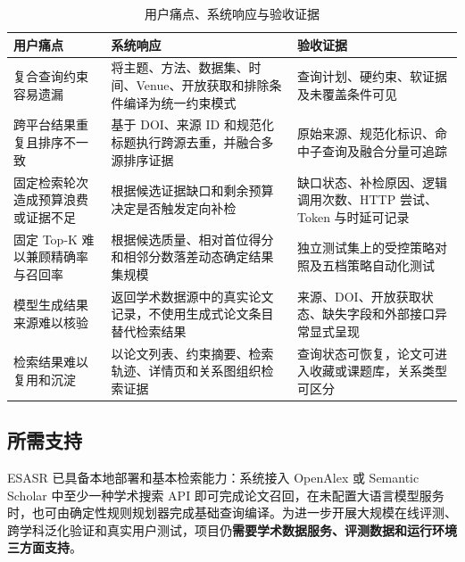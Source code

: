 \documentclass[a4paper,12pt,fontset=none]{ctexart}
\begin{document}
\begin{table}[H]
	\centering
	\caption{用户痛点、系统响应与验收证据}
	\small
	
	\begin{tabularx}{\textwidth}{C{2.8cm} Y Y}
		\toprule
		
		\textbf{用户痛点}
		& \textbf{系统响应}
		& \textbf{验收证据} \\
		
		\midrule
		
		复合查询约束容易遗漏
		& 将主题、方法、数据集、时间、Venue、开放获取和排除条件编译为统一约束模式
		& 查询计划、硬约束、软证据及未覆盖条件可见 \\
		
		跨平台结果重复且排序不一致
		& 基于 DOI、来源 ID 和规范化标题执行跨源去重，并融合多源排序证据
		& 原始来源、规范化标识、命中子查询及融合分量可追踪 \\
		
		固定检索轮次造成预算浪费或证据不足
		& 根据候选证据缺口和剩余预算决定是否触发定向补检
		& 缺口状态、补检原因、逻辑调用次数、HTTP 尝试、Token 与时延可记录 \\
		
		固定 Top-K 难以兼顾精确率与召回率
		& 根据候选质量、相对首位得分和相邻分数落差动态确定结果集规模
		& 独立测试集上的受控策略对照及五档策略自动化测试 \\
		
		模型生成结果来源难以核验
		& 返回学术数据源中的真实论文记录，不使用生成式论文条目替代检索结果
		& 来源、DOI、开放获取状态、缺失字段和外部接口异常显式呈现 \\
		
		检索结果难以复用和沉淀
		& 以论文列表、约束摘要、检索轨迹、详情页和关系图组织检索证据
		& 查询状态可恢复，论文可进入收藏或课题库，关系类型可区分 \\
		
		\bottomrule
	\end{tabularx}
\end{table}

\subsection{所需支持}

ESASR 已具备本地部署和基本检索能力：系统接入 OpenAlex 或 Semantic Scholar 中至少一种学术搜索 API 即可完成论文召回，在未配置大语言模型服务时，也可由确定性规则规划器完成基础查询编译。为进一步开展大规模在线评测、跨学科泛化验证和真实用户测试，项目仍\textbf{需要学术数据服务、评测数据和运行环境三方面支持}。
\end{document}
